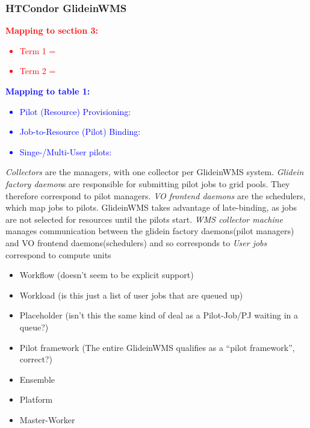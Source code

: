 \documentclass{sig-alternate}
\begin{document}
%
\subsubsection{HTCondor GlideinWMS}

\textcolor{red}
{
\textbf{Mapping to section 3:}
\begin{itemize}
\item Term 1 =
\item Term 2 =
\end{itemize}
}

\textcolor{blue}
{
\textbf{Mapping to table 1:}
\begin{itemize}
\item Pilot (Resource) Provisioning:
\item Job-to-Resource (Pilot) Binding:
\item Singe-/Multi-User pilots:
\end{itemize}
}

\textit{Collectors} are the managers, with one collector per
GlideinWMS system.
\textit{Glidein factory daemon}s are responsible for
submitting pilot jobs to grid pools.
They therefore correspond to pilot managers.
\textit{VO frontend daemons} are the schedulers, which map jobs
to pilots.  GlideinWMS takes advantage of late-binding, as
jobs are not selected for resources until the pilots start.
\textit{WMS collector machine} manages communication between the glidein
factory daemons(pilot managers) and VO frontend daemons(schedulers)
and so corresponds to 
\textit{User jobs} correspond to compute units 

\begin{itemize}
\item Workflow (doesn't seem to be explicit support)
\item Workload (is this just a list of user jobs that are queued up)
\item Placeholder (isn't this the same kind of deal as a Pilot-Job/PJ
waiting in a queue?)
\item Pilot framework (The entire GlideinWMS qualifies as a ``pilot
framework'', correct?)
\item Ensemble 
\item Platform 
\item Master-Worker 
\end{itemize}
\end{document}
